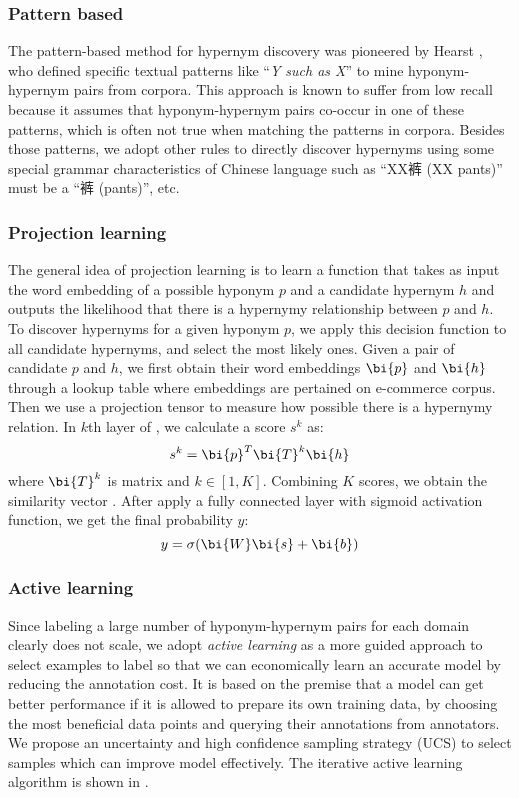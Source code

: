 \subsubsection{Pattern based}
The pattern-based method for hypernym discovery was pioneered by Hearst \cite{hearst1992automatic}, who defined specific textual patterns like ``\textit{Y such as X}'' to mine hyponym-hypernym pairs from corpora.
This approach is known to suffer from low recall because it assumes that hyponym-hypernym pairs co-occur in one of these patterns, 
which is often not true when matching the patterns in corpora.
Besides those patterns,
we adopt other rules to directly discover hypernyms using some special grammar characteristics of Chinese language such as ``XX裤 (XX pants)'' must be a ``裤 (pants)'', etc.

\subsubsection{Projection learning}
The general idea of projection learning is to learn a function that takes as input the word embedding of a possible hyponym $p$ and a candidate hypernym $h$ and outputs the likelihood that there is a hypernymy relationship between $p$ and $h$. 
To discover hypernyms for a given hyponym $p$, we apply this decision function to all candidate hypernyms, and select the most likely ones.
Given a pair of candidate $p$ and $h$, we first obtain their 
word embeddings $\bi{p}$ and $\bi{h}$ through a lookup table where embeddings are pertained on e-commerce corpus. 
Then we use a projection tensor  to measure how possible there is a hypernymy relation. 
In $k$th layer of , we calculate a score $s^k$ as:
\begin{equation}
s^k = \bi{p}^T\bi{T}^k\bi{h}
\end{equation}
where $\bi{T}^k$ is matrix and $k \in [1, K]$.
Combining $K$ scores, we obtain the similarity vector .
After apply a fully connected layer with sigmoid activation function,
we get the final probability $y$:
\begin{equation}
y = \sigma(\bi{W}\bi{s}+\bi{b})
\end{equation}
 

\subsubsection{Active learning}
Since labeling a large number of hyponym-hypernym pairs for each domain clearly does not scale, 
we adopt \textit{active learning} as a more guided approach to select examples to label so that we can economically learn an accurate model by reducing the annotation cost.
It is based on the premise that a model can get better performance if it is allowed to prepare its own training data, by choosing the most beneficial data points and querying their annotations from annotators.
We propose an uncertainty and high confidence sampling strategy (UCS) to select samples which can improve model effectively.
The iterative active learning algorithm is shown in .

